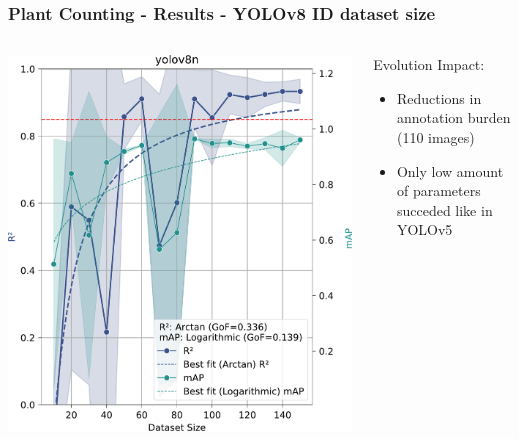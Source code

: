 \documentclass[aspectratio=43]{beamer}
\begin{document}
\begin{frame}
    \frametitle{Plant Counting - Results - YOLOv8 ID dataset size}
    \begin{columns}
        \begin{column}{0.5\textwidth}
            \begin{center}
                \includegraphics[width=1\textwidth]{Imgs/r2_ap_vs_dataset_size_yolov8_2.pdf}
            \end{center}
        \end{column}
        
        \begin{column}{0.5\textwidth}
            \begin{block}{Evolution Impact:}
                \scriptsize
                \begin{itemize}
                \item Reductions in annotation burden (110 images)
                \item Only low amount of parameters succeded like in YOLOv5
                \end{itemize}
            \end{block}
        \end{column}
    \end{columns}
\end{frame}
\end{document}
